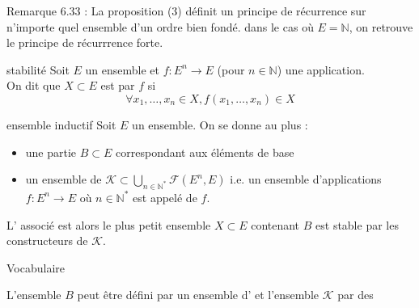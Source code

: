         Remarque 6.33 : 
        La proposition (3) définit un principe de récurrence sur n'importe quel ensemble d'un ordre bien fondé. dans le cas où $E = \mathbb{N}$, on retrouve le principe de récurrrence forte.

                

        \begin{definition}{6.35}{stabilité}
            Soit $E$ un ensemble et $f:E^n \rightarrow E$ (pour $n \in \mathbb{N}$) une application. \\ On dit que $X \subset E$ est  par $f$ si $$ \forall x_1,\ldots,x_n \in X, f(x_1,\ldots,x_n) \in X$$
        \end{definition}

        \begin{definition}{6.36}{ensemble inductif}
            Soit $E$ un ensemble. On se donne au plus :  \begin{itemize}
                \item une partie $B \subset E$ correspondant aux éléments de base
                \item un ensemble de  $\mathcal{K} \subset \bigcup_{n \in \mathbb{N}^*} \mathcal{F}(E^n,E)$ i.e. un ensemble d'applications $f:E^n \rightarrow E$
                où $n \in \mathbb{N}^*$ est appelé  de $f$.
            \end{itemize}
        L' associé est alors le plus petit ensemble $X \subset E$ contenant $B$ est stable par les constructeurs de $\mathcal{K}$.
        \end{definition}

        \begin{remarque}{6.37}{Vocabulaire}
            \item L'ensemble $B$ peut être défini par un ensemble d' et l'ensemble $\mathcal{K}$ par des 
        \end{remarque}

